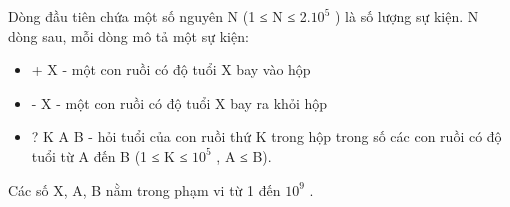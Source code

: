 Dòng đầu tiên chứa một số nguyên N (1 ≤ N ≤ 2.$10^{5}$   ) là số lượng sự kiện. N dòng sau, mỗi dòng mô tả một sự kiện:  
\begin{itemize}
	\item     + X - một con ruồi có độ tuổi X bay vào hộp   
	\item     - X - một con ruồi có độ tuổi X bay ra khỏi hộp   
	\item     ? K A B - hỏi tuổi của con ruồi thứ K trong hộp trong số các con ruồi có độ tuổi từ A đến B (1 ≤ K ≤ $10^{5}$    , A ≤ B).   
\end{itemize}

   Các số X, A, B nằm trong phạm vi từ 1 đến $10^{9}$   .